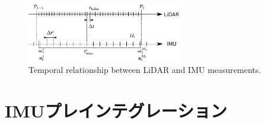 \begin{figure}[!t]
  \centering
  \includegraphics[width=0.6\textwidth]{../figs/time_relationships.pdf}
  \caption{Temporal relationship between LiDAR and IMU measurements.}
  \label{fig:time_relationships}
\end{figure}
















\section{IMUプレインテグレーション}
\label{subsec:imu_preintegration}

